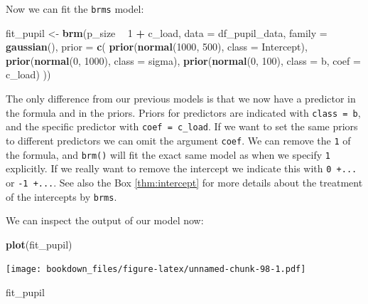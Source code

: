 \documentclass[12pt,]{krantz}
\newenvironment{Shaded}{\begin{snugshade}}{\end{snugshade}}
\newcommand{\DataTypeTok}[1]{\textcolor[rgb]{0.13,0.29,0.53}{#1}}
\newcommand{\DecValTok}[1]{\textcolor[rgb]{0.00,0.00,0.81}{#1}}
\newcommand{\KeywordTok}[1]{\textcolor[rgb]{0.13,0.29,0.53}{\textbf{#1}}}
\newcommand{\NormalTok}[1]{#1}
\newcommand{\OperatorTok}[1]{\textcolor[rgb]{0.81,0.36,0.00}{\textbf{#1}}}
\newcommand{\StringTok}[1]{\textcolor[rgb]{0.31,0.60,0.02}{#1}}
\theoremstyle{definition}
\theoremstyle{definition}
\theoremstyle{definition}
\theoremstyle{remark}
\begin{document}
Now we can fit the \texttt{brms} model:

\begin{Shaded}
\begin{Highlighting}[]
\NormalTok{fit_pupil <-}\StringTok{ }\KeywordTok{brm}\NormalTok{(p_size }\OperatorTok{~}\StringTok{ }\DecValTok{1} \OperatorTok{+}\StringTok{ }\NormalTok{c_load,}
                 \DataTypeTok{data =}\NormalTok{ df_pupil_data,}
                 \DataTypeTok{family =} \KeywordTok{gaussian}\NormalTok{(),}
                 \DataTypeTok{prior =} \KeywordTok{c}\NormalTok{(}
                     \KeywordTok{prior}\NormalTok{(}\KeywordTok{normal}\NormalTok{(}\DecValTok{1000}\NormalTok{, }\DecValTok{500}\NormalTok{), }\DataTypeTok{class =}\NormalTok{ Intercept),}
                     \KeywordTok{prior}\NormalTok{(}\KeywordTok{normal}\NormalTok{(}\DecValTok{0}\NormalTok{, }\DecValTok{1000}\NormalTok{), }\DataTypeTok{class =}\NormalTok{ sigma),}
                     \KeywordTok{prior}\NormalTok{(}\KeywordTok{normal}\NormalTok{(}\DecValTok{0}\NormalTok{, }\DecValTok{100}\NormalTok{), }\DataTypeTok{class =}\NormalTok{ b, }\DataTypeTok{coef =}\NormalTok{ c_load)}
\NormalTok{                 )) }
\end{Highlighting}
\end{Shaded}

The only difference from our previous models is that we now have a predictor in the formula and in the priors. Priors for predictors are indicated with \texttt{class\ =\ b}, and the specific predictor with \texttt{coef\ =\ c\_load}. If we want to set the same priors to different predictors we can omit the argument \texttt{coef}. We can remove the \texttt{1} of the formula, and \texttt{brm()} will fit the exact same model as when we specify \texttt{1} explicitly. If we really want to remove the intercept we indicate this with \texttt{0\ +...} or \texttt{-1\ +...}. See also the Box \ref{thm:intercept} for more details about the treatment of the intercepts by \texttt{brms}.

We can inspect the output of our model now:

\begin{Shaded}
\begin{Highlighting}[]
\KeywordTok{plot}\NormalTok{(fit_pupil)}
\end{Highlighting}
\end{Shaded}

\texttt{[image: bookdown\_files/figure-latex/unnamed-chunk-98-1.pdf]}

\begin{Shaded}
\begin{Highlighting}[]
\NormalTok{fit_pupil}
\end{Highlighting}
\end{Shaded}
\end{document}
